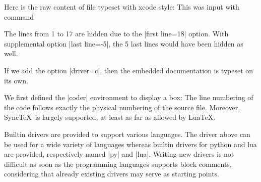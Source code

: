 \documentclass{article}
\begin{document}
%
 {
\endtrivlist
}
Here is the raw content of file  typeset with  xcode style:
This was input with command
\begin{CDRBlock}[tags=src]
\end{CDRBlock}
The lines from 1 to 17 are hidden due to the
\CDRCode|first line=18| option.
With supplemental option \CDRCode|last line=-5|, the 5 last lines would have been hidden as well.

If we add the option \CDRCode|driver=c|, then the embedded documentation is typeset on its own.
We first defined the \CDRCode|coder| environment to display a box:
The line numbering of the code follows exactly the physical numbering of the source file.
Moreover, Sync\TeX\ is largely supported, at least as far as allowed by Lua\TeX.

Builtin drivers are provided to support various languages. The driver above can be used for a wide variety of languages whereas builtin drivers for python and lua are provided, respectively named \CDRCode|py| and \CDRCode|lua|.
Writing new drivers is not difficult as soon as the programming languages supports block comments,
considering that already existing drivers may serve as starting points.
\end{document}
